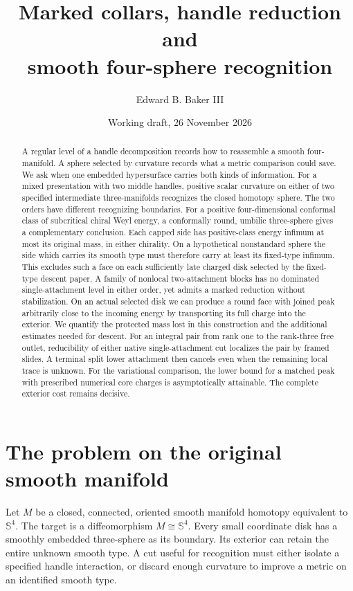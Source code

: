 \documentclass[11pt,letterpaper]{article}
\title{Marked collars, handle reduction and\\smooth four-sphere recognition}
\author{Edward B. Baker III}
\date{Working draft, 26 November 2026}
\numberwithin{equation}{section}
\newcommand{\Sph}{\mathbb S}
\begin{document}
\maketitle
\begin{abstract}
A regular level of a handle decomposition records how to reassemble a
smooth four-manifold. A sphere selected by curvature records what a metric
comparison could save. We ask when one embedded hypersurface carries
both kinds of information. For a mixed presentation with two middle
handles, positive scalar curvature on either of two specified intermediate
three-manifolds recognizes the closed homotopy sphere. The two orders
have different recognizing boundaries. For a positive four-dimensional
conformal class of subcritical chiral Weyl energy, a conformally round,
umbilic three-sphere gives a complementary conclusion. Each capped
side has positive-class energy infimum at most its original mass, in
either chirality. On a hypothetical nonstandard sphere the side which
carries its smooth type must therefore carry at least its fixed-type
infimum. This excludes such a face on each sufficiently late charged
disk selected by the fixed-type descent paper. A family of nonlocal
two-attachment blocks has no dominated single-attachment level in
either order, yet admits a marked reduction without stabilization.
On an actual selected disk we can produce a round face with joined
peak arbitrarily close to the incoming energy by transporting its
full charge into the exterior. We quantify the protected mass lost
in this construction and the additional estimates needed for descent.
For an integral pair from rank one to the rank-three free outlet,
reducibility of either native single-attachment cut localizes the pair
by framed slides. A terminal split lower attachment then cancels even
when the remaining local trace is unknown. For the variational comparison, the lower bound for a
matched peak with prescribed numerical core charges is asymptotically
attainable. The complete exterior cost remains decisive.
\end{abstract}

\section{The problem on the original smooth manifold}

Let \(M\) be a closed, connected, oriented smooth manifold homotopy
equivalent to \(\Sph^4\). The target is a diffeomorphism \(M\cong\Sph^4\).
Every small coordinate disk has a smoothly embedded three-sphere as
its boundary. Its exterior can retain the entire unknown smooth type.
A cut useful for recognition must either isolate a
specified handle interaction, or discard enough curvature to improve a
metric on an identified smooth type.
\end{document}
